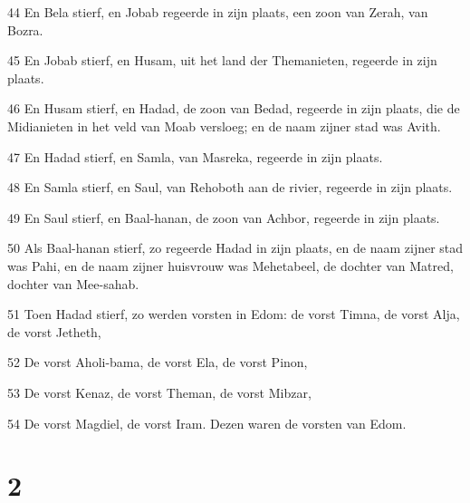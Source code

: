 \par 44 En Bela stierf, en Jobab regeerde in zijn plaats, een zoon van Zerah, van Bozra.
\par 45 En Jobab stierf, en Husam, uit het land der Themanieten, regeerde in zijn plaats.
\par 46 En Husam stierf, en Hadad, de zoon van Bedad, regeerde in zijn plaats, die de Midianieten in het veld van Moab versloeg; en de naam zijner stad was Avith.
\par 47 En Hadad stierf, en Samla, van Masreka, regeerde in zijn plaats.
\par 48 En Samla stierf, en Saul, van Rehoboth aan de rivier, regeerde in zijn plaats.
\par 49 En Saul stierf, en Baal-hanan, de zoon van Achbor, regeerde in zijn plaats.
\par 50 Als Baal-hanan stierf, zo regeerde Hadad in zijn plaats, en de naam zijner stad was Pahi, en de naam zijner huisvrouw was Mehetabeel, de dochter van Matred, dochter van Mee-sahab.
\par 51 Toen Hadad stierf, zo werden vorsten in Edom: de vorst Timna, de vorst Alja, de vorst Jetheth,
\par 52 De vorst Aholi-bama, de vorst Ela, de vorst Pinon,
\par 53 De vorst Kenaz, de vorst Theman, de vorst Mibzar,
\par 54 De vorst Magdiel, de vorst Iram. Dezen waren de vorsten van Edom.

\chapter{2}

